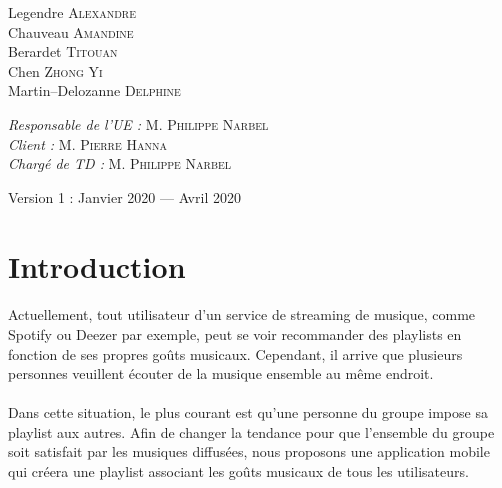 \documentclass[12pt, openany]{report}
\begin{document}
\begin{titlepage}
\begin{sffamily}
\begin{center}
    \begin{minipage}{0.4\textwidth}
      \begin{flushleft} \large
        Legendre \textsc{Alexandre}\\
        Chauveau \textsc{Amandine}\\
        Berardet \textsc{Titouan}\\
        Chen \textsc{Zhong Yi}\\
        Martin--Delozanne \textsc{Delphine}\\
      \end{flushleft}
    \end{minipage}
    \begin{minipage}{0.4\textwidth}
      \begin{flushright} \large
        \emph{Responsable de l'UE : } M. \textsc{Philippe Narbel}\\
        \emph{Client : } M. \textsc{Pierre Hanna}\\
        \emph{Chargé de TD : } M. \textsc{Philippe Narbel}
      \end{flushright}
    \end{minipage}

    \vfill

    {\large Version 1 : Janvier 2020 — Avril 2020}

  \end{center}
  \end{sffamily}
\end{titlepage}

\tableofcontents
\newpage

\section{Introduction}

\paragraph{}Actuellement, tout utilisateur d'un service de streaming de musique, comme Spotify ou Deezer par exemple, peut se voir recommander des playlists en fonction de ses propres goûts musicaux.
Cependant, il arrive que plusieurs personnes veuillent écouter de la musique ensemble au même endroit.
\paragraph{}Dans cette situation, le plus courant est qu'une personne du groupe impose sa playlist aux autres.
Afin de changer la tendance pour que l'ensemble du groupe soit satisfait par les musiques diffusées, nous proposons une application mobile qui créera une playlist associant les goûts musicaux de tous les utilisateurs.
\end{document}
